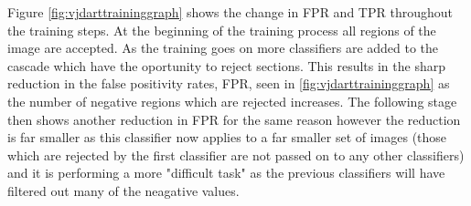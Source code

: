 \documentclass{article}
\begin{document}
\begin{multicols}{2}
\begin{multicols}{2}
{
  }
 

\end{multicols}
\label{fig:vjdarttraininggraph}

Figure \ref{fig:vjdarttraininggraph} shows the change in FPR and TPR throughout the
training steps. At the beginning of the training process all regions of the
image are accepted. As the training goes on more classifiers are added to the
cascade which have the oportunity to reject sections. This results in the sharp
reduction in the false positivity rates, FPR, seen in
\ref{fig:vjdarttraininggraph} as the number of negative regions which are
rejected increases. The following stage then shows another reduction in FPR for
the same reason however the reduction is far smaller as this classifier now
applies to a far smaller set of images (those which are rejected by the first
classifier are not passed on to any other classifiers) and it is performing a
more "difficult task" \cite{vj} as the previous classifiers will have filtered
out many of the neagative values.


\end{multicols}
\end{document}
